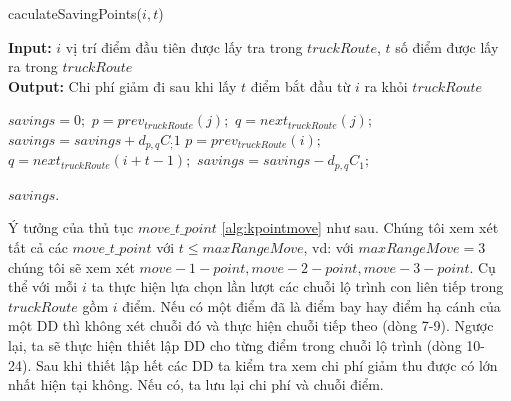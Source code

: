 \documentclass[a4paper,12pt]{report}
\begin{document}
\begin{algorithm}[H]

\caption{caculateSavingPoints($i,t$)}
\textbf{Input:} $i$ vị trí điểm đầu tiên được lấy tra trong $truckRoute$, $t$ số điểm được lấy ra trong $truckRoute$\\
\textbf{Output:} Chi phí giảm đi sau khi lấy $t$ điểm bắt đầu từ $i$ ra khỏi $truckRoute$

\begin{algorithmic}[1]
\State $savings=0;$
\State $p=prev_{truckRoute}(j);$
\State $q=next_{truckRoute}(j);$
\State $savings=savings+ d_{p,q}C_;1$
\EndFor
\State $p=prev_{truckRoute}(i);$
\State $q=next_{truckRoute}(i+t-1);$
\State $savings=savings- d_{p,q}C_1;$

\Return $savings$.
\end{algorithmic}
\label{alg:caculateSavingPoints}
\end{algorithm}
Ý tưởng của thủ tục $move\_t\_point$ \ref{alg:kpointmove} như sau. Chúng tôi xem xét tất cả các $move\_t\_point$ với $t \leq maxRangeMove$, vd: với $maxRangeMove=3$ chúng tôi sẽ xem xét $move-1-point,move-2-point,move-3-point$. 
Cụ thể với mỗi $i$ ta thực hiện lựa chọn lần lượt các chuỗi lộ trình con liên tiếp trong $truckRoute$ gồm $i$ điểm. Nếu có một điểm đã là điểm bay hay điểm hạ cánh của một \ac{DD} thì không xét chuỗi đó và thực hiện chuỗi tiếp theo (dòng 7-9). Ngược lại, ta sẽ thực hiện thiết lập \ac{DD} cho từng điểm trong chuỗi lộ trình (dòng 10- 24). Sau khi thiết lập hết các \ac{DD} ta kiểm tra xem chi phí giảm thu được có lớn nhất hiện tại không. Nếu có, ta lưu lại chi phí và chuỗi điểm. \\
\end{document}
